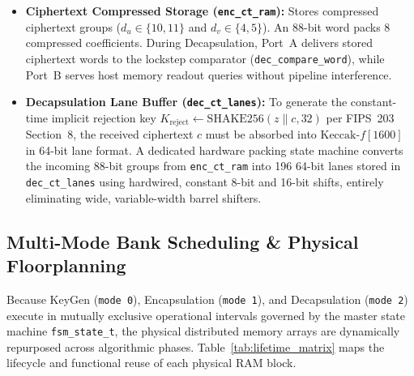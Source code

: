 \begin{itemize}
    \item \textbf{Ciphertext Compressed Storage (\texttt{enc\_ct\_ram}):} Stores compressed ciphertext groups ($d_u \in \{10, 11\}$ and $d_v \in \{4, 5\}$). An 88-bit word packs 8 compressed coefficients. During Decapsulation, Port~A delivers stored ciphertext words to the lockstep comparator (\texttt{dec\_compare\_word}), while Port~B serves host memory readout queries without pipeline interference.
    
    \item \textbf{Decapsulation Lane Buffer (\texttt{dec\_ct\_lanes}):} To generate the constant-time implicit rejection key $K_{\text{reject}} \leftarrow \text{SHAKE256}(z \parallel c, 32)$ per FIPS~203 Section~8, the received ciphertext $c$ must be absorbed into $\text{Keccak-}f[1600]$ in 64-bit lane format. A dedicated hardware packing state machine converts the incoming 88-bit groups from \texttt{enc\_ct\_ram} into 196 64-bit lanes stored in \texttt{dec\_ct\_lanes} using hardwired, constant 8-bit and 16-bit shifts, entirely eliminating wide, variable-width barrel shifters.
\end{itemize}

\subsection{Multi-Mode Bank Scheduling \& Physical Floorplanning}
\label{sec:mem_scheduling}

Because KeyGen (\texttt{mode 0}), Encapsulation (\texttt{mode 1}), and Decapsulation (\texttt{mode 2}) execute in mutually exclusive operational intervals governed by the master state machine \texttt{fsm\_state\_t}, the physical distributed memory arrays are dynamically repurposed across algorithmic phases. Table~\ref{tab:lifetime_matrix} maps the lifecycle and functional reuse of each physical RAM block.


